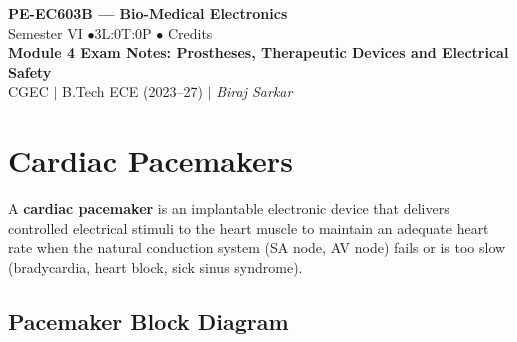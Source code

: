 \documentclass[12pt,a4paper]{article}
\begin{document}

\begin{center}
  {\LARGE\bfseries\color{myred} PE-EC603B --- Bio-Medical Electronics}\\[5pt]
  {\normalsize\color{mydark} Semester VI \quad$\bullet$\quad 3L:0T:0P \quad$\bullet$ Credits}\\[3pt]
  {\normalsize\color{myteal}\textbf{Module 4 Exam Notes: Prostheses, Therapeutic Devices and Electrical Safety}}\\[3pt]
  {\small\color{mydark} CGEC \;$|$\; B.Tech ECE (2023--27) \;$|$\; \textit{Biraj Sarkar}}
\end{center}
\vspace{2pt}
\noindent{\color{myred}\rule{\linewidth}{1.5pt}}
\vspace{2pt}

\hypersetup{linkcolor=mydark}
\tableofcontents
\hypersetup{linkcolor=myteal}
\newpage

\section{Cardiac Pacemakers}

\begin{tcolorbox}[defbox, title={\textbf{Definition: Cardiac Pacemaker}}]
A \textbf{cardiac pacemaker} is an implantable electronic device that delivers controlled electrical stimuli to the heart muscle to maintain an adequate heart rate when the natural conduction system (SA node, AV node) fails or is too slow (bradycardia, heart block, sick sinus syndrome).
\end{tcolorbox}

\subsection{Pacemaker Block Diagram}
\end{document}
